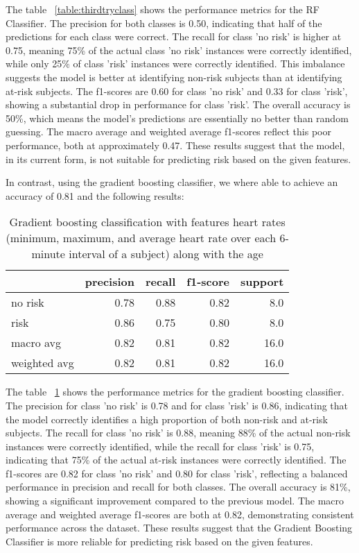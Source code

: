 The table ~\ref{table:thirdtryclass} shows the performance metrics for the RF Classifier. The precision for both classes is 0.50, indicating that half of the predictions for each class were correct. The recall for class 'no risk' is higher at 0.75, meaning 75\% of the actual class 'no risk' instances were correctly identified, while only 25\% of class 'risk' instances were correctly identified. This imbalance suggests the model is better at identifying non-risk subjects than at identifying at-risk subjects. The f1-scores are 0.60 for class 'no risk' and 0.33 for class 'risk', showing a substantial drop in performance for class 'risk'. The overall accuracy is 50\%, which means the model's predictions are essentially no better than random guessing. The macro average and weighted average f1-scores reflect this poor performance, both at approximately 0.47. These results suggest that the model, in its current form, is not suitable for predicting risk based on the given features.

In contrast, using the gradient boosting classifier, we where able to achieve an accuracy of 0.81 and the following results:

\begin{table}[H]
\centering
\begin{tabular}{lrrrr}
\toprule
{} & precision & recall & f1-score & support \\
\midrule
no risk & 0.78 & 0.88 & 0.82 & 8.0 \\
risk & 0.86 & 0.75 & 0.80 & 8.0 \\
macro avg & 0.82 & 0.81 & 0.82 & 16.0 \\
weighted avg & 0.82 & 0.81 & 0.82 & 16.0 \\
\bottomrule
\end{tabular}
\caption{Gradient boosting classification with features heart rates (minimum, maximum, and average heart rate over each 6-minute interval of a subject) along with the age}
\label{table:boostnr1}
\end{table}

The table ~\ref{table:boostnr1} shows the performance metrics for the gradient boosting classifier. The precision for class 'no risk' is 0.78 and for class 'risk' is 0.86, indicating that the model correctly identifies a high proportion of both non-risk and at-risk subjects. The recall for class 'no risk' is 0.88, meaning 88\% of the actual non-risk instances were correctly identified, while the recall for class 'risk' is 0.75, indicating that 75\% of the actual at-risk instances were correctly identified. The f1-scores are 0.82 for class 'no risk' and 0.80 for class 'risk', reflecting a balanced performance in precision and recall for both classes. The overall accuracy is 81\%, showing a significant improvement compared to the previous model. The macro average and weighted average f1-scores are both at 0.82, demonstrating consistent performance across the dataset. These results suggest that the Gradient Boosting Classifier is more reliable for predicting risk based on the given features.

